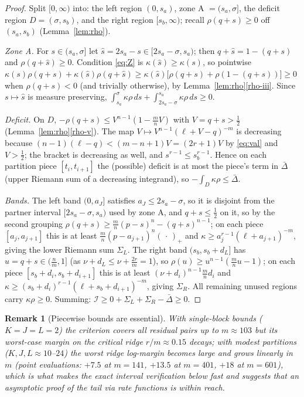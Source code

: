 \documentclass[11pt]{article}
\newtheorem{remark}[theorem]{Remark}
\begin{document}
\begin{proof}
Split $[0,\infty)$ into: the left region $(0,s_a)$, zone A $=(s_a,\sigma]$, the deficit region $D=(\sigma,s_b)$, and the right region $[s_b,\infty)$; recall $\rho(q+s)\ge0$ off $(s_a,s_b)$ (Lemma~\ref{lem:rho}).

\emph{Zone A.}  For $s\in(s_a,\sigma]$ let $\hat s=2s_a-s\in[2s_a-\sigma,s_a)$; then $q+\hat s=1-(q+s)$ and $\rho(q+\hat s)\ge0$.  Condition \eqref{eq:Z} is $\kappa(\hat s)\ge\kappa(s)$, so pointwise
$\kappa(s)\rho(q+s)+\kappa(\hat s)\rho(q+\hat s)\ge\kappa(\hat s)\bigl[\rho(q+s)+\rho(1-(q+s))\bigr]\ge0$ when $\rho(q+s)<0$ (and trivially otherwise), by Lemma~\ref{lem:rho}\ref{rho-iii}.  Since $s\mapsto\hat s$ is measure preserving,
$\int_{s_a}^{\sigma}\kappa\rho\,ds+\int_{2s_a-\sigma}^{s_a}\kappa\rho\,ds\ge0$.

\emph{Deficit.}  On $D$, $-\rho(q+s)\le V^{n-1}(1-\tfrac mnV)$ with $V=q+s>\tfrac12$ (Lemma~\ref{lem:rho}\ref{rho-v}).  The map $V\mapsto V^{n-1}(\ell+V-q)^{-m}$ is decreasing because $(n-1)(\ell-q)<(m-n+1)V=(2r+1)V$ by \eqref{eq:val} and $V>\tfrac12$; the bracket is decreasing as well, and $s^{r-1}\le s_b^{r-1}$.  Hence on each partition piece $[t_i,t_{i+1}]$ the (possible) deficit is at most the piece's term in $\bar\Delta$ (upper Riemann sum of a decreasing integrand), so $-\int_D\kappa\rho\le\bar\Delta$.

\emph{Bands.}  The left band $(0,a_J]$ satisfies $a_J\le2s_a-\sigma$, so it is disjoint from the partner interval $[2s_a-\sigma,s_a)$ used by zone A, and $q+s\le\tfrac12$ on it, so by the second grouping $\rho(q+s)\ge\tfrac mn(p-s)^n-(q+s)^{n-1}$; on each piece $[a_j,a_{j+1}]$ this is at least $\tfrac mn(p-a_{j+1})^n(\,\cdot\,)_+$ and $\kappa\ge a_j^{r-1}(\ell+a_{j+1})^{-m}$, giving the lower Riemann sum $\Sigma_L$.  The right band $(s_b,s_b+d_L]$ has $u=q+s\in(\tfrac nm,1]$ (as $\nu+d_L\le\nu+\tfrac{2r}m=1$), so $\rho(u)\ge u^{n-1}(\tfrac mnu-1)$; on each piece $[s_b+d_i,s_b+d_{i+1}]$ this is at least $(\nu+d_i)^{n-1}\tfrac mn d_i$ and $\kappa\ge(s_b+d_i)^{r-1}(\ell+s_b+d_{i+1})^{-m}$, giving $\Sigma_R$.  All remaining unused regions carry $\kappa\rho\ge0$.  Summing:
$\mathcal I\ge0+\Sigma_L+\Sigma_R-\bar\Delta\ge0$.
\end{proof}

\begin{remark}[Piecewise bounds are essential]
With single-block bounds ($K=J=L=2$) the criterion covers all residual pairs up to $m\approx103$ but its worst-case margin on the critical ridge $r/m\approx0.15$ decays; with modest partitions ($K,J,L\approx10$--$24$) the worst ridge log-margin becomes large and \emph{grows linearly in $m$} (point evaluations: $+7.5$ at $m=141$, $+13.5$ at $m=401$, $+18$ at $m=601$), which is what makes the exact interval verification below fast and suggests that an asymptotic proof of the tail via rate functions is within reach.
\end{remark}
\end{document}
